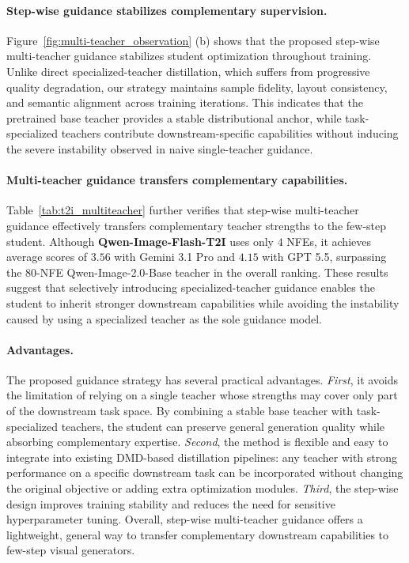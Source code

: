\documentclass{llmxive}
\begin{document}
\paragraph{Step-wise guidance stabilizes complementary supervision.}
Figure~\ref{fig:multi-teacher_observation} (b) shows that the proposed step-wise multi-teacher guidance stabilizes student optimization throughout training. 
Unlike direct specialized-teacher distillation, which suffers from progressive quality degradation, our strategy maintains sample fidelity, layout consistency, and semantic alignment across training iterations. 
This indicates that the pretrained base teacher provides a stable distributional anchor, while task-specialized teachers contribute downstream-specific capabilities without inducing the severe instability observed in naive single-teacher guidance.


\paragraph{Multi-teacher guidance transfers complementary capabilities.}
Table~\ref{tab:t2i_multiteacher} further verifies that step-wise multi-teacher guidance effectively transfers complementary teacher strengths to the few-step student. Although \textbf{Qwen-Image-Flash-T2I} uses only $4$ NFEs, it achieves average scores of $3.56$ with Gemini 3.1 Pro and $4.15$ with GPT 5.5, surpassing the $80$-NFE Qwen-Image-2.0-Base teacher in the overall ranking. These results suggest that selectively introducing specialized-teacher guidance enables the student to inherit stronger downstream capabilities while avoiding the instability caused by using a specialized teacher as the sole guidance model.

\paragraph{Advantages.}
The proposed guidance strategy has several practical advantages. 
\textit{First}, it avoids the limitation of relying on a single teacher whose strengths may cover only part of the downstream task space. 
By combining a stable base teacher with task-specialized teachers, the student can preserve general generation quality while absorbing complementary expertise. 
\textit{Second}, the method is flexible and easy to integrate into existing DMD-based distillation pipelines: any teacher with strong performance on a specific downstream task can be incorporated without changing the original objective or adding extra optimization modules. 
\textit{Third}, the step-wise design improves training stability and reduces the need for sensitive hyperparameter tuning. Overall, step-wise multi-teacher guidance offers a lightweight, general way to transfer complementary downstream capabilities to few-step visual generators.
\end{document}
